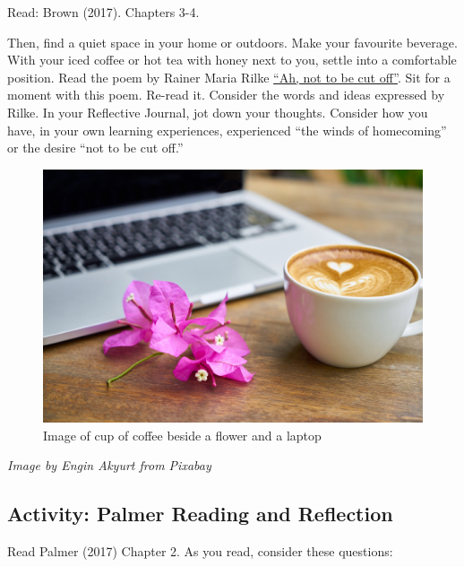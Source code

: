 \documentclass[
]{book}
\providecommand{\tightlist}{%
  \setlength{\itemsep}{0pt}\setlength{\parskip}{0pt}}
\begin{document}
\begin{reflect}
Read: Brown (2017). Chapters 3-4.

Then, find a quiet space in your home or outdoors. Make your favourite
beverage. With your iced coffee or hot tea with honey next to you,
settle into a comfortable position. Read the poem by Rainer Maria Rilke
\href{https://gladdestthing.com/poems/ah-not-to-be-cut-off}{``Ah, not to
be cut off''}. Sit for a moment with this poem. Re-read it. Consider the
words and ideas expressed by Rilke. In your Reflective Journal, jot down
your thoughts. Consider how you have, in your own learning experiences,
experienced ``the winds of homecoming'' or the desire ``not to be cut
off.''

\begin{figure}
\centering
\includegraphics{assets/unit3/coffee-2242212_1920.jpg}
\caption{Image of cup of coffee beside a flower and a laptop}
\end{figure}

\emph{Image by Engin Akyurt from Pixabay}
\end{reflect}

\hypertarget{activity-palmer-reading-and-reflection}{%
\subsection{Activity: Palmer Reading and Reflection}\label{activity-palmer-reading-and-reflection}}

\begin{reflect}
Read Palmer (2017) Chapter 2. As you read, consider these questions:

\end{reflect}
\end{document}
